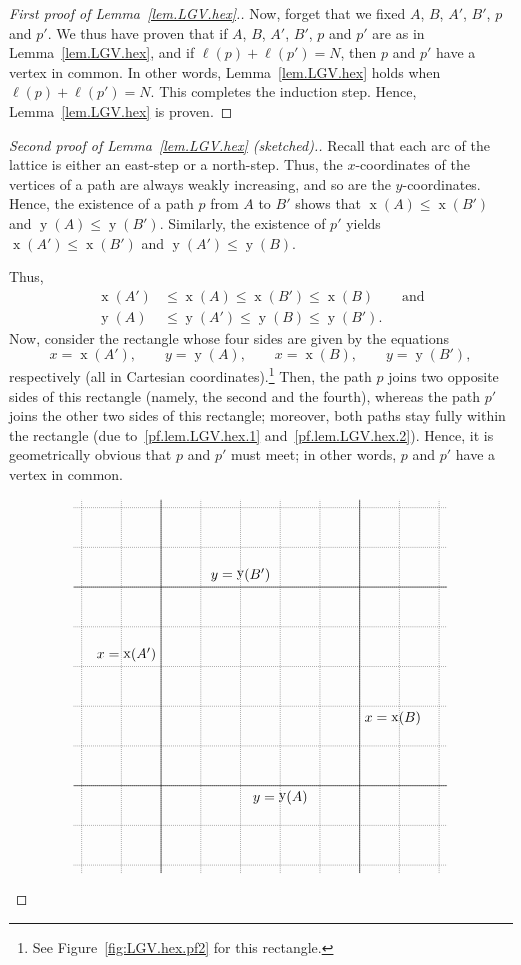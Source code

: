 \documentclass[reqno]{amsart}
\newcommand{\0}{\phantom{c}}
\DeclareMathOperator{\xcoord}{x} %
\DeclareMathOperator{\ycoord}{y} %
\newenvironment{verlonglong}{}{}
\theoremstyle{plain}
\theoremstyle{definition}
\numberwithin{equation}{section}
\begin{document}
\begin{verlonglong}
\begin{proof}[First proof of Lemma~\ref{lem.LGV.hex}.]
Now, forget that we fixed $A$, $B$, $A'$, $B'$, $p$ and $p'$.
We thus have proven that if $A$, $B$, $A'$, $B'$, $p$ and $p'$ are as in Lemma~\ref{lem.LGV.hex}, and if $\ell(p) + \ell(p') = N$, then $p$ and $p'$ have a vertex in common.
In other words, Lemma~\ref{lem.LGV.hex} holds when $\ell(p) + \ell(p') = N$.
This completes the induction step.
Hence, Lemma~\ref{lem.LGV.hex} is proven.
\end{proof}

\begin{proof}[Second proof of Lemma~\ref{lem.LGV.hex} (sketched).]
Recall that each arc of the lattice is either an east-step or a north-step.
Thus, the $x$-coordinates of the vertices of a path are always weakly increasing, and so are the $y$-coordinates.
Hence, the existence of a path $p$ from $A$ to $B'$ shows that $\xcoord(A) \leq \xcoord(B')$ and $\ycoord(A) \leq \ycoord(B')$.
Similarly, the existence of $p'$ yields $\xcoord(A') \leq \xcoord(B')$ and $\ycoord(A') \leq\ycoord(B)$.

Thus,
\begin{align}
\xcoord(A')  & \leq \xcoord(A)  \leq \xcoord(B') \leq \xcoord(B) \qquad \text{and} \label{pf.lem.LGV.hex.1} \\
\ycoord(A)  & \leq \ycoord(A') \leq \ycoord(B) \leq \ycoord(B'). \label{pf.lem.LGV.hex.2}
\end{align}
Now, consider the rectangle whose four sides are given by the equations
\[
x = \xcoord(A'), \qquad
y = \ycoord(A), \qquad
x = \xcoord(B), \qquad
y = \ycoord(B'),
\]
respectively (all in Cartesian coordinates).\footnote{See Figure~\ref{fig:LGV.hex.pf2} for this rectangle.}
Then, the path $p$ joins two opposite sides of this rectangle (namely, the second and the fourth), whereas
the path $p'$ joins the other two sides of this rectangle; moreover, both paths stay fully within the rectangle (due to~\eqref{pf.lem.LGV.hex.1} and~\eqref{pf.lem.LGV.hex.2}).
Hence, it is geometrically obvious that $p$ and $p'$ must meet; in other words, $p$ and $p'$ have a vertex in common.

\begin{figure}[t]
\[
\begin{tikzpicture}
  \draw[densely dotted] (-1.2,-1.2) grid (8.2,8.2);
  
  \draw (1,-1.2) -- (1,8.2);
  \draw (1,4.3) node[anchor=east] {$x = \xcoord(A')$};
  \draw (-1.2,1) -- (8.2,1);
  \draw (4,1) node[anchor=north] {$y = \ycoord(A)$};
  \draw (6,-1.2) -- (6,8.2);
  \draw (6,2.7) node[anchor=west] {$x = \xcoord(B)$};
  \draw (-1.2,6) -- (8.2,6);
  \draw (3,6) node[anchor=south] {$y = \ycoord(B')$};
  

\end{tikzpicture}\]
\end{figure}
\end{proof}
\end{verlonglong}
\end{document}
